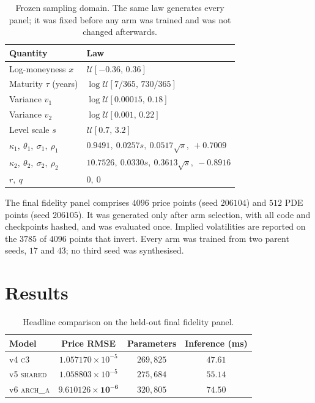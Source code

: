 \documentclass[conference]{IEEEtran}
\begin{document}
\begin{table}[t]
\centering
\caption{Frozen sampling domain. The same law generates every panel; it was
fixed before any arm was trained and was not changed afterwards.}
\label{tab:domain}
\begin{tabular}{ll}
\toprule
Quantity & Law \\
\midrule
Log-moneyness $x$          & $\mathcal{U}[-0.36,\,0.36]$ \\
Maturity $\tau$ (years)    & $\log\mathcal{U}[7/365,\,730/365]$ \\
Variance $v_1$             & $\log\mathcal{U}[0.00015,\,0.18]$ \\
Variance $v_2$             & $\log\mathcal{U}[0.001,\,0.22]$ \\
Level scale $s$            & $\mathcal{U}[0.7,\,3.2]$ \\
\midrule
$\kappa_1,\ \theta_1,\ \sigma_1,\ \rho_1$
  & $0.9491,\ 0.0257 s,\ 0.0517\sqrt{s},\ +0.7009$ \\
$\kappa_2,\ \theta_2,\ \sigma_2,\ \rho_2$
  & $10.7526,\ 0.0330 s,\ 0.3613\sqrt{s},\ -0.8916$ \\
$r,\ q$                    & $0,\ 0$ \\
\bottomrule
\end{tabular}
\end{table}

The final fidelity panel comprises $4096$ price points (seed $206104$) and
$512$ PDE points (seed $206105$). It was generated only after arm selection,
with all code and checkpoints hashed, and was evaluated once. Implied
volatilities are reported on the $3785$ of $4096$ points that invert. Every
arm was trained from two parent seeds, $17$ and $43$; no third seed was
synthesised.

\section{Results}

\begin{table}[t]
\centering
\caption{Headline comparison on the held-out final fidelity panel.}
\label{tab:headline}
\begin{tabular}{lccc}
\toprule
Model & Price RMSE & Parameters & Inference (ms) \\
\midrule
v4 \textsc{c3}                & $1.057170\times10^{-5}$ & $269{,}825$ & $47.61$ \\
v5 \textsc{shared}            & $1.058803\times10^{-5}$ & $275{,}684$ & $55.14$ \\
v6 \textsc{arch\_a}           & $\mathbf{9.610126\times10^{-6}}$ & $320{,}805$ & $74.50$ \\
\bottomrule
\end{tabular}
\end{table}
\end{document}
